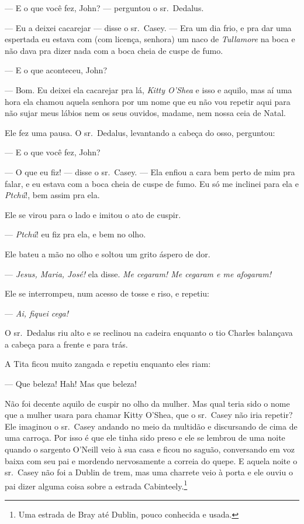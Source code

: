  --- E o que você fez, John? --- perguntou o sr.~Dedalus.

 --- Eu a deixei cacarejar --- disse o sr.~Casey. --- Era um dia frio, e pra dar uma espertada eu estava com (com licença, senhora) um naco de
\textit{Tullamore} na boca e não dava pra dizer nada com a boca cheia
de cuspe de fumo.

 --- E o que aconteceu, John?

 --- Bom. Eu deixei ela cacarejar pra lá, \textit{Kitty
O’Shea} e isso e aquilo, mas aí uma hora ela chamou
aquela senhora por um nome que eu não vou repetir aqui para não sujar
meus lábios nem os seus ouvidos, madame, nem nossa ceia de Natal.

Ele fez uma pausa. O sr.~Dedalus, levantando a cabeça do osso,
perguntou:

 --- E o que você fez, John?

 --- O que eu fiz! --- disse o sr.~Casey. --- Ela enfiou a cara bem perto de mim pra falar, e eu estava com a boca cheia de cuspe de fumo. Eu só me inclinei para ela e \textit{Ptchú}!, bem assim pra ela.

Ele se virou para o lado e imitou o ato de cuspir.

 --- \textit{Ptchú}! eu fiz pra ela, e bem no olho.

Ele bateu a mão no olho e soltou um grito áspero de dor.

 --- \textit{Jesus, Maria, José!} ela disse. \textit{Me cegaram! Me cegaram e me afogaram!}

Ele se interrompeu, num acesso de tosse e riso, e repetiu:

 --- \textit{Ai, fiquei cega!}

O sr.~Dedalus riu alto e se reclinou na cadeira enquanto o tio Charles
balançava a cabeça para a frente e para trás.

A Tita ficou muito zangada e repetiu enquanto eles riam:

 --- Que beleza! Hah! Mas que beleza!

Não foi decente aquilo de cuspir no olho da mulher.
Mas qual teria sido o nome que a mulher usara para chamar Kitty
O’Shea, que o sr.~Casey não iria repetir? Ele imaginou
o sr.~Casey andando no meio da multidão e discursando de cima de uma
carroça. Por isso é que ele tinha sido preso e ele se lembrou de uma
noite quando o sargento O’Neill veio à sua casa e
ficou no saguão, conversando em voz baixa com seu pai e mordendo
nervosamente a correia do quepe. E aquela noite o sr.~Casey não foi a
Dublin de trem, mas uma charrete veio à porta e ele ouviu o pai dizer
alguma coisa sobre a estrada Cabinteely.\footnote{ Uma estrada de Bray
até Dublin, pouco conhecida e usada.}

